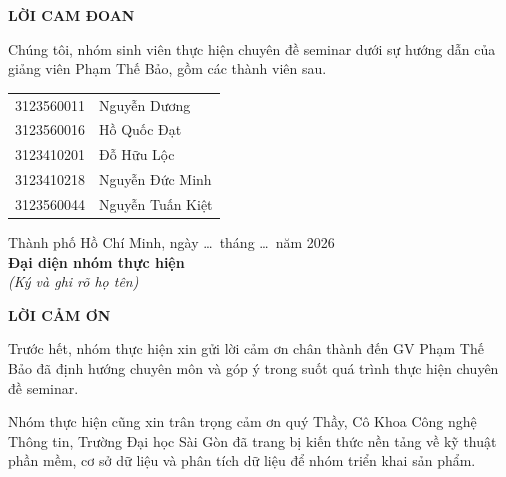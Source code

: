 \documentclass[12pt,a4paper]{article}
\newcommand{\orig}[1]{}
\newcommand{\chaptertitle}[1]{\begin{center}\large\bfseries #1\end{center}}
\begin{document}
\orig{1-2}
\newpage{}\setcounter{page}{1}
\chaptertitle{LỜI CAM ĐOAN}
Chúng tôi, nhóm sinh viên thực hiện chuyên đề seminar dưới sự hướng dẫn của giảng viên Phạm Thế Bảo, gồm các thành viên sau.

\begin{center}
\begin{tabular}{ll}
3123560011 & Nguyễn Dương\\
3123560016 & Hồ Quốc Đạt\\
3123410201 & Đỗ Hữu Lộc\\
3123410218 & Nguyễn Đức Minh\\
3123560044 & Nguyễn Tuấn Kiệt
\end{tabular}
\end{center}

\bigskip
\begin{flushright}
Thành phố Hồ Chí Minh, ngày \ldots\ tháng \ldots\ năm 2026\\
\textbf{Đại diện nhóm thực hiện}\\[2.5em]
\textit{(Ký và ghi rõ họ tên)}
\end{flushright}
\newpage{}\setcounter{page}{2}
\chaptertitle{LỜI CẢM ƠN}
Trước hết, nhóm thực hiện xin gửi lời cảm ơn chân thành đến GV Phạm Thế Bảo đã định hướng chuyên môn và góp ý trong suốt quá trình thực hiện chuyên đề seminar.

Nhóm thực hiện cũng xin trân trọng cảm ơn quý Thầy, Cô Khoa Công nghệ Thông tin, Trường Đại học Sài Gòn đã trang bị kiến thức nền tảng về kỹ thuật phần mềm, cơ sở dữ liệu và phân tích dữ liệu để nhóm triển khai sản phẩm.
\end{document}
